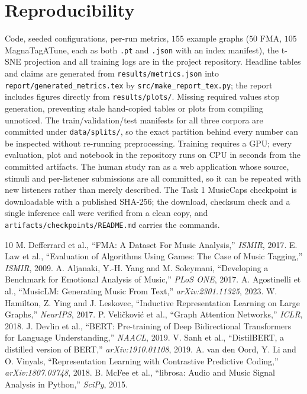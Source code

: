 \documentclass[conference]{IEEEtran}
\begin{document}
\section*{Reproducibility}
Code, seeded configurations, per-run metrics, $155$ example graphs
($50$ FMA, $105$ MagnaTagATune, each as both \texttt{.pt} and \texttt{.json}
with an index manifest), the t-SNE projection and all training logs are in the
project repository. Headline tables and claims are generated from
\texttt{results/metrics.json} into \texttt{report/generated\_metrics.tex} by
\texttt{src/make\_report\_tex.py}; the report includes figures directly from
\texttt{results/plots/}. Missing required values stop generation, preventing
stale hand-copied tables or plots from compiling unnoticed.
The train/validation/test manifests for all three corpora are committed under
\texttt{data/splits/}, so the exact partition behind every number can be
inspected without re-running preprocessing.
Training requires a GPU; every evaluation, plot and notebook in the repository
runs on CPU in seconds from the committed artifacts. The human study ran as a
web application whose source, stimuli and per-listener submissions are all
committed, so it can be repeated with new listeners rather than merely
described. The Task 1 MusicCaps checkpoint is downloadable with a published
SHA-256; the download, checksum check and a single inference call were verified
from a clean copy, and \texttt{artifacts/checkpoints/README.md} carries the
commands.

\begin{thebibliography}{10}\footnotesize\setlength{\itemsep}{0pt}\setlength{\parskip}{0pt}
 M. Defferrard et al., ``FMA: A Dataset For Music Analysis,''
\emph{ISMIR}, 2017.
 E. Law et al., ``Evaluation of Algorithms Using Games: The Case
of Music Tagging,'' \emph{ISMIR}, 2009.
 A. Aljanaki, Y.-H. Yang and M. Soleymani, ``Developing a
Benchmark for Emotional Analysis of Music,'' \emph{PLoS ONE}, 2017.
 A. Agostinelli et al., ``MusicLM: Generating Music From
Text,'' \emph{arXiv:2301.11325}, 2023.
 W. Hamilton, Z. Ying and J. Leskovec, ``Inductive
Representation Learning on Large Graphs,'' \emph{NeurIPS}, 2017.
 P. Veli\v{c}kovi\'{c} et al., ``Graph Attention Networks,''
\emph{ICLR}, 2018.
 J. Devlin et al., ``BERT: Pre-training of Deep Bidirectional
Transformers for Language Understanding,'' \emph{NAACL}, 2019.
 V. Sanh et al., ``DistilBERT, a distilled version of
BERT,'' \emph{arXiv:1910.01108}, 2019.
 A. van den Oord, Y. Li and O. Vinyals, ``Representation
Learning with Contrastive Predictive Coding,'' \emph{arXiv:1807.03748}, 2018.
 B. McFee et al., ``librosa: Audio and Music Signal Analysis
in Python,'' \emph{SciPy}, 2015.
\end{thebibliography}
\end{document}

